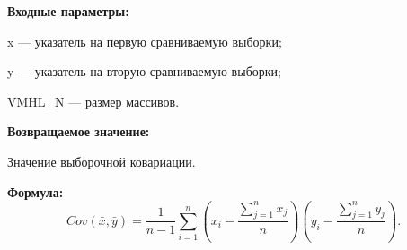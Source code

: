\textbf{Входные параметры:}
 
x --- указатель на первую сравниваемую выборки;
 
y --- указатель на вторую сравниваемую выборки;
 
VMHL\_N --- размер массивов.

\textbf{Возвращаемое значение:}
 
Значение выборочной ковариации.

\textbf{Формула:}
\begin{equation*}
Cov\left(\bar{x},\bar{y} \right)= \dfrac{1}{n-1}\sum_{i=1}^{n} \left( x_i-\dfrac{\sum_{j=1}^{n}x_j}{n}\right)\left( y_i-\dfrac{\sum_{j=1}^{n}y_j}{n}\right) .
\end{equation*}
